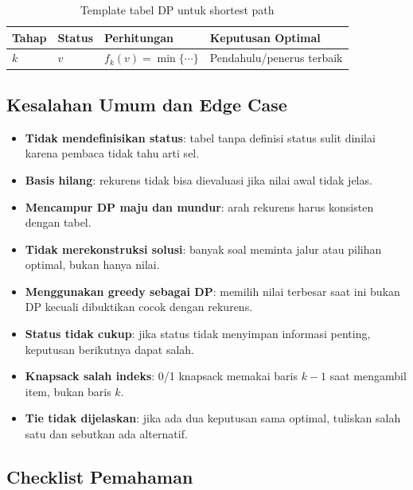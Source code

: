 \begin{table}[H]
\centering
\small
\begin{tabularx}{\textwidth}{|L{0.16\textwidth}|L{0.18\textwidth}|X|L{0.20\textwidth}|}
\hline
\textbf{Tahap} & \textbf{Status} & \textbf{Perhitungan} & \textbf{Keputusan Optimal} \\
\hline
$k$ & $v$ & $f_k(v)=\min\{\cdots\}$ & Pendahulu/penerus terbaik \\
\hline
\end{tabularx}
\caption{Template tabel DP untuk shortest path}
\label{tab:template-dp-shortest-path}
\end{table}

\subsection{Kesalahan Umum dan Edge Case}

\begin{itemize}
    \item \textbf{Tidak mendefinisikan status}: tabel tanpa definisi status sulit dinilai karena pembaca tidak tahu arti sel.
    \item \textbf{Basis hilang}: rekurens tidak bisa dievaluasi jika nilai awal tidak jelas.
    \item \textbf{Mencampur DP maju dan mundur}: arah rekurens harus konsisten dengan tabel.
    \item \textbf{Tidak merekonstruksi solusi}: banyak soal meminta jalur atau pilihan optimal, bukan hanya nilai.
    \item \textbf{Menggunakan greedy sebagai DP}: memilih nilai terbesar saat ini bukan DP kecuali dibuktikan cocok dengan rekurens.
    \item \textbf{Status tidak cukup}: jika status tidak menyimpan informasi penting, keputusan berikutnya dapat salah.
    \item \textbf{Knapsack salah indeks}: 0/1 knapsack memakai baris $k-1$ saat mengambil item, bukan baris $k$.
    \item \textbf{Tie tidak dijelaskan}: jika ada dua keputusan sama optimal, tuliskan salah satu dan sebutkan ada alternatif.
\end{itemize}

\subsection{Checklist Pemahaman}

